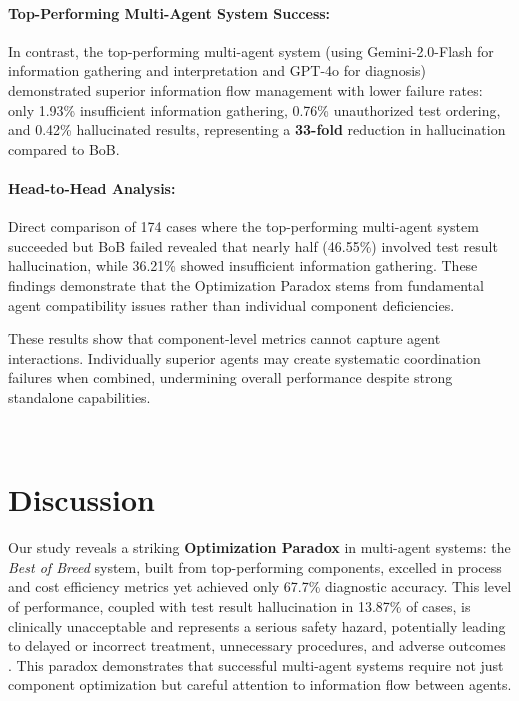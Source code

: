 \documentclass[manuscript, nonacm]{acmart}
\begin{document}
\paragraph{Top-Performing Multi-Agent System Success:}
In contrast, the top-performing multi-agent system (using Gemini-2.0-Flash for information gathering and interpretation and GPT-4o for diagnosis) demonstrated superior information flow management with lower failure rates: only 1.93\% insufficient information gathering, 0.76\% unauthorized test ordering, and 0.42\% hallucinated results, representing a \textbf{33-fold} reduction in hallucination compared to BoB.

\paragraph{Head-to-Head Analysis:}
Direct comparison of 174 cases where the top-performing multi-agent system succeeded but BoB failed revealed that nearly half (46.55\%) involved test result hallucination, while 36.21\% showed insufficient information gathering. These findings demonstrate that the Optimization Paradox stems from fundamental agent compatibility issues rather than individual component deficiencies.

These results show that component-level metrics cannot capture agent interactions. Individually superior agents may create systematic coordination failures when combined, undermining overall performance despite strong standalone capabilities.

\



\section{Discussion}

Our study reveals a striking \textbf{Optimization Paradox} in multi-agent systems: the \textit{Best of Breed} system, built from top-performing components, excelled in process and cost efficiency metrics yet achieved only 67.7\% diagnostic accuracy. This level of performance, coupled with test result hallucination in 13.87\% of cases, is clinically unacceptable and represents a serious safety hazard, potentially leading to delayed or incorrect treatment, unnecessary procedures, and adverse outcomes \cite{Macaluso2012AbdominalPain}. This paradox demonstrates that successful multi-agent systems require not just component optimization but careful attention to information flow between agents.
\end{document}
